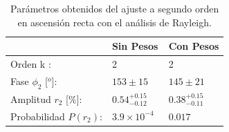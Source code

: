 		\begin{table}[H]
		\centering
			\begin{tabular}{l|l|l|}
			\cline{2-3}
			                                      			& Sin Pesos 				 & Con Pesos \\ \hline
			\multicolumn{1}{|l|}{Orden k :}       			& 2                			& 2                    \\ \hline
			\multicolumn{1}{|l|}{Fase $\phi_2$ [$^o$]:}  	& $153\pm15$    				& $145\pm21$                   \\ \hline
			\multicolumn{1}{|l|}{Amplitud $r_2$ [\%]:} 		& $0.54^{+0.15}_{-0.12}$	& $0.38^{+0.15}_{-0.11}$               \\ \hline
			\multicolumn{1}{|l|}{Probabilidad $P(r_2)$:}    & $3.9\times 10^{-4}$\      & $0.017$  \\ \hline
			\end{tabular}
		\caption{Parámetros obtenidos del ajuste a segundo orden en ascensión recta con el análisis de Rayleigh.}
		\label{table:parametros_second_order}
		\end{table}

